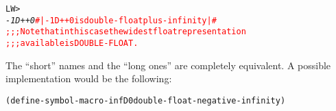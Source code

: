 \documentclass[../Float-Infinities-Nan.tex]{subfiles}
\begin{document}
\begin{alltt}
LW> 
\textit{-1D++0} \textcolor{red}{#| -1D++0 is double-float plus-infinity |#}
\textcolor{red}{;;; Note that in this case the widest float representation
;;; available is DOUBLE-FLOAT.}
\end{alltt}


\DNotes{}

The ``short'' names and the ``long ones'' are completely equivalent.
A possible implementation would be the following:
\begin{alltt}
(define-symbol-macro -infD0 double-float-negative-infinity)
\end{alltt}
\end{document}
